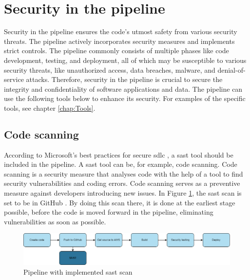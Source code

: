 \section{Security in the pipeline}
Security in the pipeline ensures the code's utmost safety from various security threats. The \gls{pipeline} actively incorporates security measures and implements strict controls. The pipeline commonly consists of multiple phases like code development, testing, and deployment, all of which may be susceptible to various security threats, like unauthorized access, data breaches, malware, and \gls{denial-of-service} attacks. Therefore, security in the pipeline is crucial to secure the integrity and confidentiality of software applications and data. The \gls{pipeline} can use the following tools below to enhance its security. For examples of the specific tools, see chapter \ref{chap:Tools}. 

\subsection{Code scanning}
\label{Code Scanning}
According to Microsoft's best practices for secure \acrshort{sdlc} \cite{microsoftSDLCpractices}, a \acrshort{sast} tool should be included in the \gls{pipeline}. A \acrshort{sast} tool can be, for example, code scanning. Code scanning is a security measure that analyses code with the help of a tool to find security vulnerabilities and coding errors. Code scanning serves as a preventive measure against developers introducing new issues. In Figure \ref{fig: Pipeline with implemented SAST scan}, the \acrshort{sast} scan is set to be in GitHub \cite{sast}. By doing this scan there, it is done at the earliest stage possible, before the code is moved forward in the pipeline, eliminating vulnerabilities as soon as possible.

 \vspace{2mm}
\begin{figure}[H]
    \centering
    \includegraphics[width=0.8\columnwidth]{Images/pipeline2.png}
    \caption{Pipeline with implemented \acrshort{sast} scan}
    \label{fig: Pipeline with implemented SAST scan}
\end{figure}

